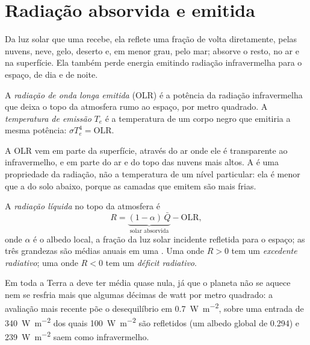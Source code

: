 \section{Radiação absorvida e emitida}\label{sec:b1:radiation-heat-transport:toa}

Da luz solar que uma  recebe, ela reflete uma fração de volta diretamente, pelas nuvens,
neve, gelo, deserto e, em menor grau, pelo mar; absorve o resto, no ar e na superfície. Ela também
perde energia emitindo radiação infravermelha para o espaço, de dia e de noite.

\begin{definition}\label{def:b1:radiation-heat-transport:olr}
A \emph{radiação de onda longa emitida} (OLR) é a potência da
radiação infravermelha que deixa o topo da atmosfera rumo ao espaço, por metro quadrado. A
\emph{temperatura de emissão} $T_e$ é a temperatura de um corpo
negro que emitiria a mesma potência:
$\sigma T_e^4 = \text{OLR}$.
\end{definition}

A OLR vem em parte da superfície, através do ar onde ele é transparente ao infravermelho, e em
parte do ar e do topo das nuvens mais altos. A  é uma propriedade da
radiação, não a temperatura de um nível particular: ela é menor que a do solo abaixo, porque as
camadas que emitem são mais frias.

\begin{definition}\label{def:b1:radiation-heat-transport:net-radiation}
A \emph{radiação líquida} no topo da atmosfera é
\[
  R = \underbrace{(1 - \alpha)\,\bar Q}_{\text{solar absorvida}} - \text{OLR},
\]
onde $\alpha$ é o albedo local, a fração da luz solar incidente refletida para o espaço; as três
grandezas são médias anuais em uma . Uma  onde $R > 0$ tem um
\emph{excedente radiativo}; uma onde $R < 0$ tem um
\emph{déficit radiativo}.
\end{definition}

Em toda a Terra a  deve ter média quase nula, já que o planeta não se aquece nem se
resfria mais que algumas décimas de watt por metro quadrado: a avaliação mais recente põe o
desequilíbrio em \qty{0.7}{W.m^{-2}}, sobre uma entrada de \qty{340}{W.m^{-2}} dos quais
\qty{100}{W.m^{-2}} são refletidos (um albedo global de \num{0.294}) e \qty{239}{W.m^{-2}} saem
como infravermelho.

